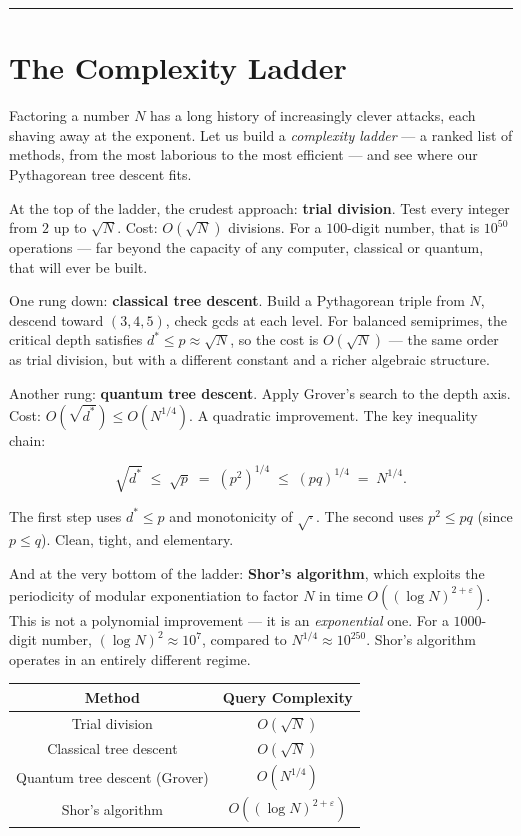 \documentclass[11pt,openany]{book}
\theoremstyle{definition}
\theoremstyle{plain}
\theoremstyle{remark}
\begin{document}
\bigskip\noindent\rule{\textwidth}{0.4pt}\bigskip


\section*{The Complexity Ladder}


Factoring a number $N$ has a long history of increasingly clever attacks, each shaving away at the exponent. Let us build a \textit{complexity ladder} — a ranked list of methods, from the most laborious to the most efficient — and see where our Pythagorean tree descent fits.

At the top of the ladder, the crudest approach: \textbf{trial division}. Test every integer from $2$ up to $\sqrt{N}$. Cost: $O(\sqrt{N})$ divisions. For a $100$-digit number, that is $10^{50}$ operations — far beyond the capacity of any computer, classical or quantum, that will ever be built.

One rung down: \textbf{classical tree descent}. Build a Pythagorean triple from $N$, descend toward $(3, 4, 5)$, check gcds at each level. For balanced semiprimes, the critical depth satisfies $d^* \leq p \approx \sqrt{N}$, so the cost is $O(\sqrt{N})$ — the same order as trial division, but with a different constant and a richer algebraic structure.

Another rung: \textbf{quantum tree descent}. Apply Grover's search to the depth axis. Cost: $O(\sqrt{d^*}) \leq O(N^{1/4})$. A quadratic improvement. The key inequality chain:

$$\sqrt{d^*} \;\leq\; \sqrt{p} \;=\; (p^2)^{1/4} \;\leq\; (pq)^{1/4} \;=\; N^{1/4}.$$

The first step uses $d^* \leq p$ and monotonicity of $\sqrt{\cdot}$. The second uses $p^2 \leq pq$ (since $p \leq q$). Clean, tight, and elementary.

And at the very bottom of the ladder: \textbf{Shor's algorithm}, which exploits the periodicity of modular exponentiation to factor $N$ in time $O((\log N)^{2+\varepsilon})$. This is not a polynomial improvement — it is an \textit{exponential} one. For a $1000$-digit number, $(\log N)^2 \approx 10^7$, compared to $N^{1/4} \approx 10^{250}$. Shor's algorithm operates in an entirely different regime.

\begin{center}
\begin{tabular}{c|c}
\toprule
Method & Query Complexity \\
\midrule
Trial division & $O(\sqrt{N})$ \\
Classical tree descent & $O(\sqrt{N})$ \\
Quantum tree descent (Grover) & $O(N^{1/4})$ \\
Shor's algorithm & $O((\log N)^{2+\varepsilon})$ \\
\bottomrule
\end{tabular}
\end{center}
\end{document}
